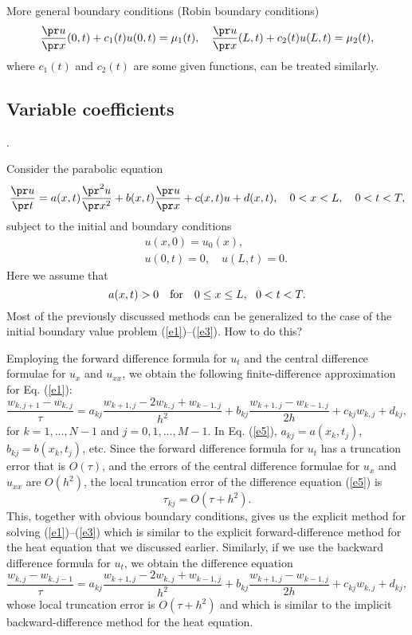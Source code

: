  
More general boundary conditions (Robin boundary conditions)
\begin{equation}
\frac{\pr u}{\pr x}(0,t)+c_{1}(t)u(0,t)=\mu_{1}(t), \quad
\frac{\pr u}{\pr x}(L,t)+c_{2}(t)u(L,t)=\mu_{2}(t), \label{d27}
\end{equation}
where $c_{1}(t)$ and $c_{2}(t)$ are some given functions, can be treated
similarly.


\subsection{Variable coefficients}.

Consider the parabolic equation
\begin{equation}
\frac{\pr u}{\pr t} =a(x,t)\frac{\pr^{2} u}{\pr x^{2}}+
b(x,t)\frac{\pr u}{\pr x}+c(x,t)u+d(x,t),  \quad 0<x< L, \quad 0<t<T, \label{e1}
\end{equation}
subject to the initial and boundary conditions
\begin{eqnarray}
&&u(x, 0) = u_{0}(x), \label{e2} \\
&&u(0,t)=0, \quad u(L,t)=0.   \label{e3}
\end{eqnarray}
Here we assume that
\begin{equation}
a(x,t)> 0 \quad {\rm for} \quad 0\leq x\leq L, \ \ 0<t<T. \label{e4}
\end{equation}
Most of the previously discussed methods can be generalized to the case of
the initial boundary value problem (\ref{e1})--(\ref{e3}).  How to do this?
 
Employing the forward difference formula for $u_t$ and
the central difference formulae for $u_x$ and $u_{xx}$, we obtain
the following finite-difference approximation for Eq. (\ref{e1}):
\begin{equation}
\frac{w_{k,j+1}-w_{k,j}}{\tau} =a_{kj}\frac{w_{k+1,j}-2w_{k,j}+w_{k-1,j}}{h^{2}}+
b_{kj}\frac{w_{k+1,j}-w_{k-1,j}}{2h}+c_{kj}w_{k,j}+d_{kj},   \label{e5}
\end{equation}
for $k=1, \dots,N-1$ and $j=0, 1,\dots,M-1$. In Eq. (\ref{e5}),
$a_{kj}=a(x_{k},t_{j})$, $b_{kj}=b(x_{k},t_{j})$, etc. Since
the forward difference formula
for $u_t$ has a truncation error that is $O(\tau)$, and
the errors of the central difference formulae for $u_x$ and $u_{xx}$
are $O(h^2)$, the local truncation error of the difference equation (\ref{e5}) is
\[
\tau_{kj}=O(\tau+h^2).
\]
This, together with obvious boundary conditions, gives us the explicit method
for solving (\ref{e1})--(\ref{e3}) which is similar to the explicit
forward-difference method for the heat equation that we discussed earlier.
Similarly, if we use the backward difference formula for $u_t$, we obtain
the difference equation
\begin{equation}
\frac{w_{k,j}-w_{k,j-1}}{\tau} =a_{kj}\frac{w_{k+1,j}-2w_{k,j}+w_{k-1,j}}{h^{2}}+
b_{kj}\frac{w_{k+1,j}-w_{k-1,j}}{2h}+c_{kj}w_{k,j}+d_{kj},   \label{e6}
\end{equation}
whose local truncation error is $O(\tau+h^2)$ and which is similar to the implicit
backward-difference method for the heat equation.
 
